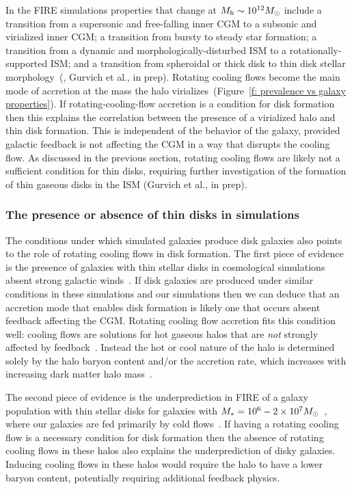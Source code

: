 \documentclass[fleqn,usenatbib]{mnras}
\begin{document}
In the FIRE simulations properties that change at $M_{\rm h}\sim10^{12} M_\odot$ include a transition from a supersonic and free-falling inner CGM to a subsonic and virialized inner CGM;
a transition from bursty to steady star formation;
a transition from a dynamic and morphologically-disturbed ISM to a rotationally-supported ISM;
and a transition from spheroidal or thick disk to thin disk stellar morphology~(\citealt{El-Badry2018a, Stern2020, Yu2021}, Gurvich et al., in prep).
Rotating cooling flows become the main mode of accretion at the mass the halo virializes~(Figure~\ref{f: prevalence vs galaxy properties}).
If rotating-cooling-flow accretion is a condition for disk formation then this explains the correlation between the presence of a virialized halo and thin disk formation.
This is independent of the behavior of the galaxy, provided galactic feedback is not affecting the CGM in a way that disrupts the cooling flow.
As discussed in the previous section, rotating cooling flows are likely not a sufficient condition for thin disks, requiring further investigation of the formation of thin gaseous disks in the ISM (Gurvich et al., in prep).

\subsubsection{The presence or absence of thin disks in simulations}
\label{s: disk formation -- population}

The conditions under which simulated galaxies produce disk galaxies also points to the role of rotating cooling flows in disk formation.
The first piece of evidence is the presence of galaxies with thin stellar disks in cosmological simulations absent strong galactic winds~\citep{Guedes2011, Bird2013}.
If disk galaxies are produced under similar conditions in these simulations and our simulations then we can deduce that an accretion mode that enables disk formation is likely one that occurs absent feedback affecting the CGM.
Rotating cooling flow accretion fits this condition well:
cooling flows are solutions for hot gaseous halos that are \textit{not} strongly affected by feedback~\citep{Stern2019}.
Instead the hot or cool nature of the halo is determined solely by the halo baryon content and/or the accretion rate, which increases with increasing dark matter halo mass~\citep{Stern2020a}.

The second piece of evidence is the underprediction in FIRE of a galaxy population with thin stellar disks for galaxies with $M_* = 10^6 \-- 2 \times 10^7 M_\odot$~\citep{El-Badry2018a}, where our galaxies are fed primarily by cold flows~\citep{Stern2020}.
If having a rotating cooling flow is a necessary condition for disk formation then the absence of rotating cooling flows in these halos also explains the underprediction of disky galaxies.
Inducing cooling flows in these halos would require the halo to have a lower baryon content, potentially requiring additional feedback physics.
\end{document}
